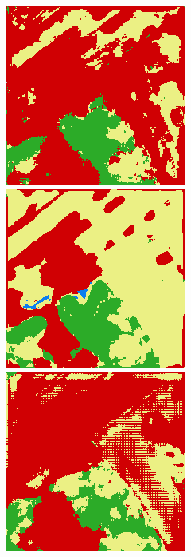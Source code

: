 \begin{figure}
    \includegraphics[width=\DensenetPredictionsImageWidth]{images/densenet/densenet-103/291991-prediction} \hfill
    \includegraphics[width=\DensenetPredictionsImageWidth]{images/densenet/densenet-67D/291991-prediction}
    \includegraphics[width=\DensenetPredictionsImageWidth]{images/densenet/densenet-56D/291991-prediction}


\end{figure}
